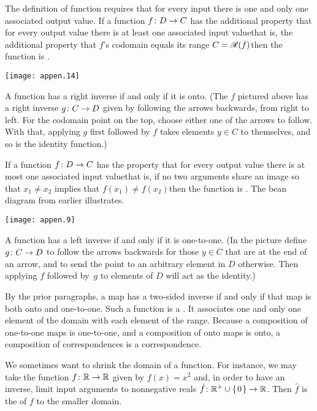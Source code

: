 The definition of function requires that for every 
input there is one and only one associated output value.
If a function $\mbox{$f\colon D\to C$}$ has the additional property that for every
output value there is at least one associated input value\Dash that is, 
the additional property that
$f$'s codomain equals its range \( C=\mathscr{R}(f) \)\Dash then 
the function is
.
\begin{center}
  \texttt{[image: appen.14]}
\end{center}
A function has a right inverse if and only if it is onto. 
(The $f$ pictured above has a right inverse $\mbox{$g\colon C\to D$}$ given by
following the arrows backwards, from right to left.
For the codomain point on the top, choose either one of the arrows to follow.
With that, applying $g$ first followed by $f$ takes elements
$y\in C$ to themselves, and so is the identity function.)

If a 
function $\mbox{$f\colon D\to C$}$ has the property that for every
output value there is at most one associated input value\Dash that is, 
if no two arguments share an image so that
\( x_1\neq x_2 \) implies  that \( f(x_1)\neq f(x_2) \)\Dash then 
the function is
.
The bean diagram from earlier illustrates.
\begin{center}
  \texttt{[image: appen.9]}
\end{center}
A function has a left inverse if and only if it is one-to-one.
(In the picture define $\mbox{$g\colon C\to D$}$ to follow the arrows backwards for
those $y\in C$ that are at the end of an arrow, and to send the point
to an arbitrary element in $D$ otherwise.
Then applying $f$ followed by~$g$ to elements of $D$ will act as the 
identity.)

By the prior paragraphs, a map has a two-sided inverse 
if and only if that map is both onto and one-to-one. 
Such a function is a 
.
It associates one and only one element of the domain with each element of the
range.
Because a composition of one-to-one maps is one-to-one, and a composition
of onto maps is onto, a composition of correspondences is a
correspondence.

We sometimes want to shrink the domain of a function.
For instance, we may take the function \( \mbox{$f\colon \mathbb{R}\to \mathbb{R}$} \) given by
\( f(x)=x^2 \) and, in order to have an inverse, limit input arguments to
nonnegative reals \( \mbox{$\hat{f}\colon \mathbb{R}^+\cup\mbox{$\{\hspace{0.1em}0\hspace{0.1em}\}$}\to \mathbb{R}$} \).
Then \( \hat{f} \) is 
the  of
\( f \) to the smaller domain.








